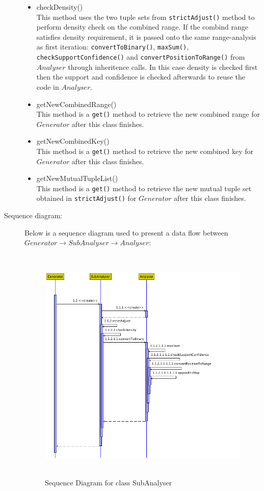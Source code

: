 \begin{description}
\begin{itemize}
	\item{checkDensity()} \\
	This method uses the two tuple sets from \texttt{strictAdjust()} method to perform density check on the combined range. If the combind range satisfies density requirement, it is passed onto the same range-analysis as first iteration: \texttt{convertToBinary()}, \texttt{maxSum()}, \texttt{checkSupportConfidence()} and \texttt{convertPositionToRange()} from $Analyser$ through inheritence calls. In this case density is checked first then the support and confidence is checked afterwards to reuse the code in $Analyser$. 
	
	\item{getNewCombinedRange()} \\
	This method is a \texttt{get()} method to retrieve the new combined range for $Generator$ after this class finishes.
	
	\item{getNewCombinedKey()} \\
	This method is a \texttt{get()} method to retrieve the new combined key for $Generator$ after this class finishes.
	
	\item{getNewMutualTupleList()} \\
		This method is a \texttt{get()} method to retrieve the new mutual tuple set obtained in \texttt{strictAdjust()} for $Generator$ after this class finishes.

\end{itemize}

\item[Sequence diagram: ] 

Below is a sequence diagram used to present a data flow between $Generator \rightarrow SubAnalyser \rightarrow Analyser$:

\begin{figure}[ht]
    \centering
    \includegraphics[width=5in, height=4.5in]{figures/sequence_subanalyser}
    \caption[Sequence Diagram for class SubAnalyser]{Sequence Diagram for class SubAnalyser}
    \label{fig:figure4_52}
\end{figure}


\end{description}
